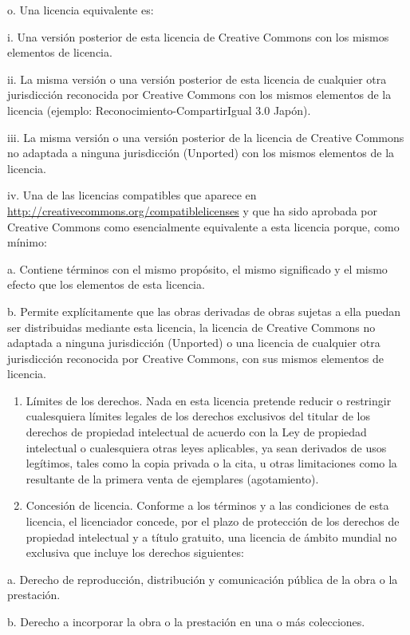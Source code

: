 \documentclass[11pt]{article}
\begin{document}
{{o. Una licencia equivalente es: 

i. Una versión posterior de esta licencia de Creative Commons con los mismos elementos de licencia. 

ii. La misma versión o una versión posterior de esta licencia de cualquier otra jurisdicción reconocida por Creative Commons con los mismos elementos de la licencia (ejemplo: Reconocimiento-CompartirIgual 3.0 Japón). 

iii. La misma versión o una versión posterior de la licencia de Creative Commons no adaptada a ninguna jurisdicción (Unported) con los mismos elementos de la licencia. 

iv. Una de las licencias compatibles que aparece en \href{http://creativecommons.org/compatiblelicenses}{http://creativecommons.org/compatiblelicenses} y que ha sido aprobada por Creative Commons como esencialmente equivalente a esta licencia porque, como mínimo: 

a. Contiene términos con el mismo propósito, el mismo significado y el mismo efecto que los elementos de esta licencia. 

b. Permite explícitamente que las obras derivadas de obras sujetas a ella puedan ser distribuidas mediante esta licencia, la licencia de Creative Commons no adaptada a ninguna jurisdicción (Unported) o una licencia de cualquier otra jurisdicción reconocida por Creative Commons, con sus mismos elementos de licencia. 

\begin{enumerate}
\item Límites de los derechos. Nada en esta licencia pretende reducir o
   restringir cualesquiera límites legales de los derechos exclusivos
   del titular de los derechos de propiedad intelectual de acuerdo con
   la Ley de propiedad intelectual o cualesquiera otras leyes
   aplicables, ya sean derivados de usos legítimos, tales como la
   copia privada o la cita, u otras limitaciones como la resultante de
   la primera venta de ejemplares (agotamiento).
\item Concesión de licencia. Conforme a los términos y a las condiciones
   de esta licencia, el licenciador concede, por el plazo de
   protección de los derechos de propiedad intelectual y a título
   gratuito, una licencia de ámbito mundial no exclusiva que incluye
   los derechos siguientes:
\end{enumerate}
a. Derecho de reproducción, distribución y comunicación pública de la obra o la prestación. 

b. Derecho a incorporar la obra o la prestación en una o más colecciones. 

}}
\end{document}
